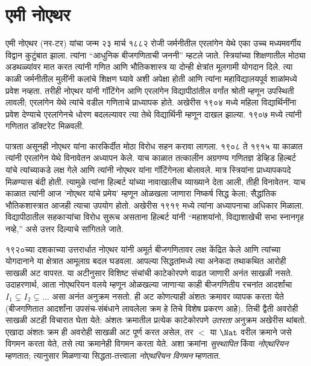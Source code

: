 \section{एमी नोएथर}\label{his:bio:noe:sec}



एमी नोएथर (\textsc{नर}-टर) यांचा जन्म २३ मार्च १८८२ रोजी जर्मनीतील एरलांगेन येथे एका उच्च मध्यमवर्गीय विद्वान कुटुंबात झाला. त्यांना “आधुनिक बीजगणिताची जननी” म्हटले जाते. स्त्रियांच्या शिक्षणातील मोठ्या अडथळ्यांवर मात करत त्यांनी गणित आणि भौतिकशास्त्र या दोन्ही क्षेत्रांत मूलगामी योगदान दिले. त्या काळी जर्मनीतील मुलींनी कलांचे शिक्षण घ्यावे अशी अपेक्षा होती आणि त्यांना महाविद्यालयपूर्व शाळांमध्ये प्रवेश नव्हता. तरीही नोएथर यांनी गॉटिंगेन आणि एरलांगेन विद्यापीठांतील वर्गांत श्रोती म्हणून उपस्थिती लावली; एरलांगेन येथे त्यांचे वडील गणिताचे प्राध्यापक होते. अखेरीस १९०४ मध्ये महिला विद्यार्थिनींना प्रवेश देण्याचे एरलांगेनचे धोरण बदलल्यावर त्या तेथे विद्यार्थिनी म्हणून दाखल झाल्या. १९०७ मध्ये त्यांनी गणितात डॉक्टरेट मिळवली.

पात्रता असूनही नोएथर यांना कारकिर्दीत मोठा विरोध सहन करावा लागला. १९०८ ते १९१५ या काळात त्यांनी एरलांगेन येथे विनावेतन अध्यापन केले. याच काळात तत्कालीन अग्रगण्य गणितज्ञ डेव्हिड हिल्बर्ट यांचे त्यांच्याकडे लक्ष गेले आणि त्यांनी नोएथर यांना गॉटिंगेनला बोलावले. मात्र स्त्रियांना प्राध्यापकपदे मिळण्यास बंदी होती. त्यामुळे त्यांना हिल्बर्ट यांच्या नावाखालीच व्याख्याने देता आली, तीही विनावेतन. याच काळात त्यांनी आज 'नोएथर यांचे प्रमेय' म्हणून ओळखला जाणारा निष्कर्ष सिद्ध केला; सैद्धांतिक भौतिकशास्त्रात आजही त्याचा उपयोग होतो. अखेरीस १९१९ मध्ये त्यांना अध्यापनाचा अधिकार मिळाला. विद्यापीठातील सहकाऱ्यांचा विरोध सुरूच असताना हिल्बर्ट यांनी “महाशयांनो, विद्याशाखेची सभा स्नानगृह नव्हे,” असे उत्तर दिल्याचे सांगितले जाते.

१९२०च्या दशकाच्या उत्तरार्धात नोएथर यांनी अमूर्त बीजगणितावर लक्ष केंद्रित केले आणि त्यांच्या योगदानाने या क्षेत्रात आमूलाग्र बदल घडवला. आपल्या सिद्धतांमध्ये त्या अनेकदा तथाकथित आरोही साखळी अट वापरत. या अटीनुसार विशिष्ट संचांची काटेकोरपणे वाढत जाणारी अनंत साखळी नसते. उदाहरणार्थ, आता नोएथरियन वलये म्हणून ओळखल्या जाणाऱ्या काही बीजगणितीय रचनांत आदर्शांचा $I_1
\subsetneq I_2 \subsetneq \dots$ असा अनंत अनुक्रम नसतो. ही अट कोणत्याही अंशतः क्रमावर व्यापक करता येते (बीजगणितात आदर्शांना उपसंच-संबंधाने लावलेला क्रम हे तिचे विशेष प्रकरण आहे). तिची द्वैती अवरोही साखळी अटही विचारात घेता येते: अंशतः क्रमातील प्रत्येक काटेकोरपणे \emph{उतरता} अनुक्रम अखेरीस थांबतो. एखादा अंशतः क्रम ही अवरोही साखळी अट पूर्ण करत असेल, तर $<$ या $\Nat$ वरील क्रमाने जसे विगमन करता येते, तसे त्या क्रमानेही विगमन करता येते. अशा क्रमांना \emph{सुस्थापित} किंवा \emph{नोएथरियन} म्हणतात; त्यानुसार मिळणाऱ्या सिद्धता-तत्त्वाला \emph{नोएथरियन विगमन} म्हणतात.


